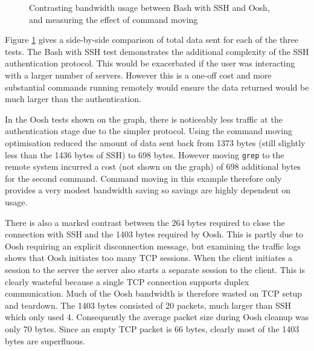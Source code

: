 \documentclass[12pt,twoside,notitlepage]{report}
\begin{document}
\begin{figure}[h]
  \centering
  \setlength\fboxsep{0.5pt}
  \setlength\fboxrule{0.5pt}
  \caption{Contrasting bandwidth usage between Bash with SSH and Oosh,
  and measuring the effect of command moving}
\label{networkgraph}
\end{figure}

Figure \ref{networkgraph} gives a side-by-side comparison of total
data sent for each of the three tests. The Bash with SSH test
demonstrates the additional complexity of the SSH authentication
protocol. This would be exacerbated if the user was interacting with a
larger number of servers. However this is a one-off cost and more
substantial commands running remotely would ensure the data returned
would be much larger than the authentication.

In the Oosh tests shown on the graph, there is noticeably less traffic
at the authentication stage due to the simpler protocol. Using the
command moving optimisation reduced the amount of data sent back from
1373 bytes (still slightly less than the 1436 bytes of SSH) to 698
bytes. However moving {\tt grep} to the remote system incurred a cost
(not shown on the graph) of 698 additional bytes for the second
command. Command moving in this example therefore only provides a very
modest bandwidth saving so savings are highly dependent on usage.

There is also a marked contrast between the 264 bytes required to
close the connection with SSH and the 1403 bytes required by
Oosh. This is partly due to Oosh requiring an explicit disconnection
message, but examining the traffic logs shows that Oosh initiates too
many TCP sessions. When the client initiates a session to the server
the server also starts a separate session to the client. This is
clearly wasteful because a single TCP connection supports duplex
communication. Much of the Oosh bandwidth is therefore wasted on TCP
setup and teardown. The 1403 bytes consisted of 20 packets, much
larger than SSH which only used 4. Consequently the average packet
size during Oosh cleanup was only 70 bytes. Since an empty TCP packet
is 66 bytes, clearly most of the 1403 bytes are superfluous.
\end{document}
